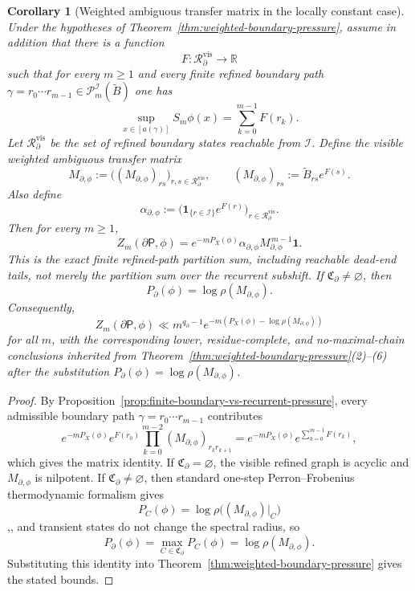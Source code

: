 \documentclass{etds}%
\numberwithin{equation}{section}
\theoremstyle{plain}
\newtheorem{corollary}[theorem]{Corollary}
\theoremstyle{definition}
\theoremstyle{remark}
\begin{document}
\begin{corollary}[Weighted ambiguous transfer matrix in the locally constant case]
\label{cor:weighted-ambiguous-matrix}
Under the hypotheses of Theorem~\ref{thm:weighted-boundary-pressure}, assume
in addition that there is a function
\[
F:\mathcal{R}_\partial^{\mathrm{vis}}\to\mathbb{R}
\]
such that for every $m\ge 1$ and every finite refined boundary path
$\gamma=r_0\cdots r_{m-1}\in\mathcal{P}_m^{\mathcal{I}}(\widetilde{B})$ one has
\[
\sup_{x\in[a(\gamma)]}S_m\phi(x)=\sum_{k=0}^{m-1}F(r_k).
\]
Let $\mathcal{R}_\partial^{\mathrm{vis}}$ be the set of refined boundary states
reachable from $\mathcal{I}$.  Define the visible weighted ambiguous transfer
matrix
\[
M_{\partial,\phi}
 :=\bigl((M_{\partial,\phi})_{rs}\bigr)_{r,s\in\mathcal{R}_\partial^{\mathrm{vis}}},
\qquad
(M_{\partial,\phi})_{rs}:=\widetilde{B}_{rs}e^{F(s)}.
\]
Also define
\[
\alpha_{\partial,\phi}
:=\bigl(\mathbf{1}_{\{r\in\mathcal{I}\}}e^{F(r)}\bigr)_{r\in\mathcal{R}_\partial^{\mathrm{vis}}}.
\]
Then for every $m\ge 1$,
\[
Z_m(\partial\mathsf{P},\phi)
=e^{-mP_X(\phi)}\alpha_{\partial,\phi}M_{\partial,\phi}^{\,m-1}\mathbf{1}.
\]
This is the exact finite refined-path partition sum, including reachable
dead-end tails, not merely the partition sum over the recurrent subshift.
If $\mathfrak{C}_\partial\neq\varnothing$, then
\[
P_\partial(\phi)=\log\rho(M_{\partial,\phi}).
\]
Consequently,
\[
Z_m(\partial\mathsf{P},\phi)\ll
m^{q_\partial-1}
e^{-m(P_X(\phi)-\log\rho(M_{\partial,\phi}))}
\]
for all $m$, with the corresponding lower, residue-complete, and
no-maximal-chain conclusions inherited from
Theorem~\ref{thm:weighted-boundary-pressure}\emph{(2)}--\emph{(6)} after the
substitution $P_\partial(\phi)=\log\rho(M_{\partial,\phi})$.
\end{corollary}

\begin{proof}
By Proposition~\ref{prop:finite-boundary-vs-recurrent-pressure}, every
admissible boundary path $\gamma=r_0\cdots r_{m-1}$ contributes
\[
e^{-mP_X(\phi)}e^{F(r_0)}\prod_{k=0}^{m-2}(M_{\partial,\phi})_{r_kr_{k+1}}
=e^{-mP_X(\phi)}e^{\sum_{k=0}^{m-1}F(r_k)},
\]
which gives the matrix identity.  If $\mathfrak{C}_\partial=\varnothing$, the
visible refined graph is acyclic and $M_{\partial,\phi}$ is nilpotent.  If
$\mathfrak{C}_\partial\neq\varnothing$, then standard one-step
Perron--Frobenius thermodynamic formalism gives
\[
P_C(\phi)=\log\rho\bigl((M_{\partial,\phi})|_C\bigr)
\]
\cite[Ch.~1]{Bowen1975},\cite[Ch.~9]{WaltersErgodicTheory}, and transient
states do not change the spectral radius, so
\[
P_\partial(\phi)=\max_{C\in\mathfrak{C}_\partial}P_C(\phi)
=\log\rho(M_{\partial,\phi}).
\]
Substituting this identity into
Theorem~\ref{thm:weighted-boundary-pressure} gives the stated bounds.
\end{proof}
\end{document}
